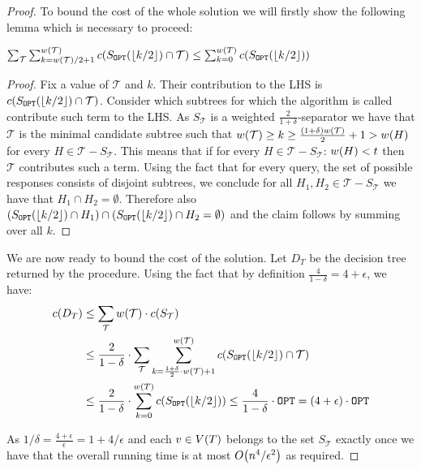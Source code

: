 \begin{theorem}
\begin{proof}
            To bound the cost of the whole solution we will firstly show the following lemma which is necessary to proceed:
            \begin{lemma}
            $\sum_{\mathcal{T}}\sum_{k=w\mathopen{}\left( \mathcal{T} \right)/2+1}^{w\mathopen{}\left( \mathcal{T} \right)}c\mathopen{}\left( S_{\texttt{OPT}}\mathopen{}\left( \mathopen{}\left\lfloor k/2 \right\rfloor \right)\cap \mathcal{T} \right)\leq \sum_{k=0}^{w\mathopen{}\left( T \right)}c\mathopen{}\left( S_{\texttt{OPT}}\mathopen{}\left( \mathopen{}\left\lfloor k/2 \right\rfloor \right) \right)$
            \begin{proof}
                Fix a value of $\mathcal{T}$ and $k$. Their contribution to the LHS is $c\mathopen{}\left( S_{\texttt{OPT}}\mathopen{}\left( \mathopen{}\left\lfloor k/2 \right\rfloor \right)\cap \mathcal{T} \right)$. Consider which subtrees for which the algorithm is called contribute such term to the LHS. As $S_{\mathcal{T}}$ is a weighted $\frac{2}{1+\delta}$-separator we have that $\mathcal{T}$ is the minimal candidate subtree such that $w\mathopen{}\left( \mathcal{T} \right)\geq k\geq \frac{\mathopen{}\left( 1+\delta \right)w\mathopen{}\left( \mathcal{T} \right)}{2}+1 >w\mathopen{}\left( H \right)$ for every $H\in \mathcal{T}-S_{\mathcal{T}}$. This means that if for every $H\in \mathcal{T}-S_{\mathcal{T}}$: $w\mathopen{}\left( H \right)<t$ then $\mathcal{T}$ contributes such a term. Using the fact that for every query, the set of possible responses consists of disjoint subtrees, we conclude for all $H_1, H_2\in \mathcal{T}-S_{\mathcal{T}}$ we have that $H_1\cap H_2=\emptyset$. Therefore also $\mathopen{}\left( S_{\texttt{OPT}}\mathopen{}\left( \mathopen{}\left\lfloor k/2 \right\rfloor \right)\cap H_1 \right)\cap \mathopen{}\left( S_{\texttt{OPT}}\mathopen{}\left( \mathopen{}\left\lfloor k/2 \right\rfloor \right)\cap H_2=\emptyset \right)$ and the claim follows by summing over all $k$.
            \end{proof}
            \end{lemma}
        We are now ready to bound the cost of the solution. Let $D_T$ be the decision tree returned by the procedure. Using the fact that by definition $\frac{4}{1-\delta}=4+\epsilon$, we have:
        \begin{align*}
            c\mathopen{}\left( D_T \right) &\leq \sum_{\mathcal{T}} w\mathopen{}\left( \mathcal{T} \right)\cdot c\mathopen{}\left( S_\mathcal{T} \right)\\
            &\leq \frac{2}{1-\delta}\cdot\sum_{\mathcal{T}}\sum_{k=\frac{1+\delta}{2}\cdot w\mathopen{}\left( \mathcal{T} \right)+1}^{w\mathopen{}\left( \mathcal{T} \right)}c\mathopen{}\left( S_{\texttt{OPT}}\mathopen{}\left( \mathopen{}\left\lfloor k/2 \right\rfloor \right)\cap \mathcal{T} \right)\\
            &\leq \frac{2}{1-\delta}\cdot\sum_{k=0}^{w\mathopen{}\left( T \right)}c\mathopen{}\left( S_{\texttt{OPT}}\mathopen{}\left( \mathopen{}\left\lfloor k/2 \right\rfloor \right) \right)\leq \frac{4}{1-\delta}\cdot\texttt{OPT} = \mathopen{}\left( 4+\epsilon \right)\cdot\texttt{OPT}
    \end{align*}
        
    As $1/\delta=\frac{4+\epsilon}{\epsilon}=1+4/\epsilon$ and each $v\in V\mathopen{}\left( T \right)$ belongs to the set $S_{\mathcal{T}}$ exactly once we have that the overall running time is at most $O\mathopen{}\left( n^4/\epsilon^2 \right)$ as required.
        \end{proof}
    \end{theorem}
